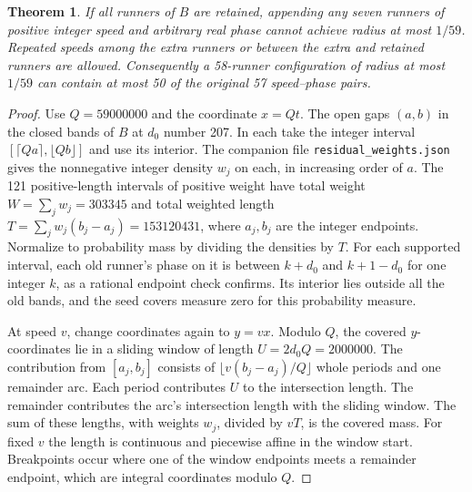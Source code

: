 \documentclass[11pt]{article}
\newtheorem{theorem}{Theorem}
\begin{document}
\begin{theorem}\label{thm:weights}
If all runners of \(B\) are retained, appending any seven runners
of positive integer speed and arbitrary real phase cannot achieve
radius at most \(1/59\). Repeated speeds among the extra runners
or between the extra and retained runners are allowed. Consequently
a 58-runner configuration of radius at most \(1/59\) can contain at
most 50 of the original 57 speed--phase pairs.
\end{theorem}
\begin{proof}
Use \(Q=59000000\) and the coordinate \(x=Qt\). The open gaps
\((a,b)\) in the closed bands of \(B\) at \(d_0\) number 207.
In each take the integer interval
\([\lceil Qa\rceil,\lfloor Qb\rfloor]\) and use its interior.
The companion file \texttt{residual\_weights.json} gives the
nonnegative integer density \(w_j\) on each, in increasing order of
\(a\). The 121 positive-length intervals of positive weight have
total weight \(W=\sum_j w_j=303345\) and total weighted length
\(T=\sum_j w_j(b_j-a_j)=153120431\), where \(a_j,b_j\) are the
integer endpoints. Normalize to probability mass by dividing the
densities by \(T\). For each supported interval, each old runner's
phase on it is between \(k+d_0\) and \(k+1-d_0\) for one integer
\(k\), as a rational endpoint check confirms. Its interior lies
outside all the old bands, and the seed covers measure zero for
this probability measure.

At speed \(v\), change coordinates again to \(y=vx\).
Modulo \(Q\), the covered \(y\)-coordinates lie in a sliding
window of length \(U=2d_0Q=2000000\). The contribution from
\([a_j,b_j]\) consists of
\(\lfloor v(b_j-a_j)/Q\rfloor\) whole periods and one remainder arc.
Each period contributes \(U\) to the intersection length.
The remainder contributes the arc's intersection length with the
sliding window. The sum of these lengths, with weights \(w_j\),
divided by \(vT\), is the covered mass.
For fixed \(v\) the length is continuous and piecewise affine in
the window start. Breakpoints occur where one of the window
endpoints meets a remainder endpoint, which are integral
coordinates modulo \(Q\).


\end{proof}
\end{document}
